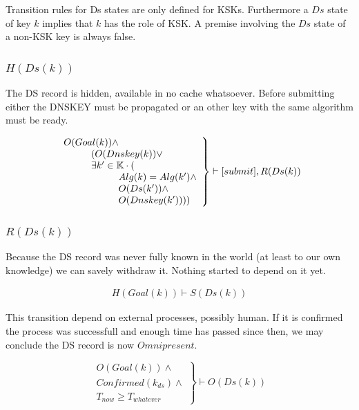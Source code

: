 \documentclass[twoside,english, a4paper]{article}
\newcommand{\mathbox}[1]{#1}
\begin{document}
Transition rules for Ds states are only defined for KSKs. Furthermore
a $Ds$ state of key $k$ implies that $k$ has the role of KSK. A premise 
involving the $Ds$ state of a non-KSK key is always false.

\subsubsection{$H(Ds(k))$}



	
	The DS record is hidden, available in no cache whatsoever.
	Before submitting either the DNSKEY must be propagated or an other 
	key with the same algorithm must be ready.
	
	\begin{equation}
		\left.
		\begin{array}{l}
			O(Goal(k)) \wedge \\
\hskip 1cm		(O(Dnskey(k)) \vee \\
\hskip 1cm		\exists k' \in \mathbb{K} \cdot ( \\
\hskip 2cm			Alg(k)=Alg(k') \wedge \\
\hskip 2cm			O(Ds(k')) \wedge \\
\hskip 2cm			O(Dnskey(k'))))
		\end{array}
		\right\}\vdash [submit], R(Ds(k)) 
	\end{equation}

\subsubsection{$R(Ds(k))$}

\mathbox{
	
	Because the DS record was never fully known in the world (at 
	least to our own knowledge) we can savely withdraw it. Nothing 
	started to depend on it yet.
	
	\begin{equation}
		\begin{split}
			H(Goal(k)) \vdash S(Ds(k))
		\end{split}
	\end{equation}

	This transition depend on external processes, possibly human. If it 
	is confirmed the process was successfull and enough time has passed
	since then, we may conclude the DS record is now $Omnipresent$.
	
	\begin{equation}
		\left.
		\begin{array}{l}
			O(Goal(k)) \wedge \\
			Confirmed(k_{ds}) \wedge \\
			T_{now} \geq T_{whatever}
		\end{array}
		\right\}\vdash O(Ds(k))
	\end{equation}
}
\end{document}
